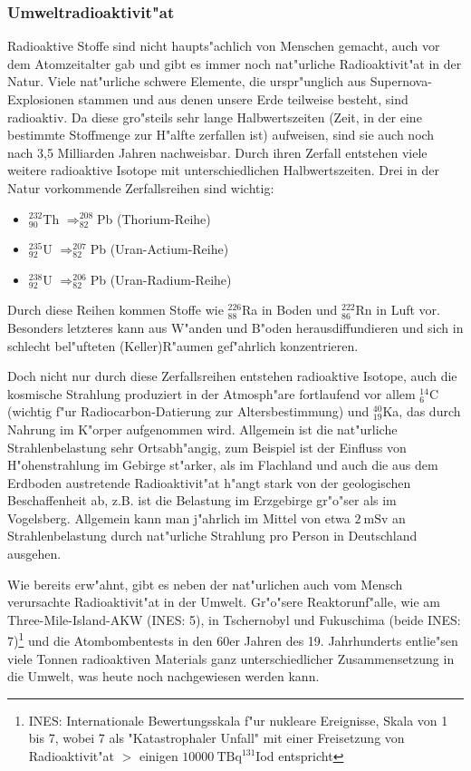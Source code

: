 \documentclass[12pt]{article}
\begin{document}
\subsubsection{Umweltradioaktivit"at}
\label{ch:umw}
Radioaktive Stoffe sind nicht haupts"achlich von Menschen gemacht, auch vor dem Atomzeitalter gab und gibt es immer noch nat"urliche Radioaktivit"at in der Natur. Viele nat"urliche schwere Elemente, die urspr"unglich aus Supernova-Explosionen stammen und aus denen unsere Erde teilweise besteht, sind radioaktiv. Da diese gro"steils sehr lange Halbwertszeiten (Zeit, in der eine bestimmte Stoffmenge zur H"alfte zerfallen ist) aufweisen, sind sie auch noch nach 3,5 Milliarden Jahren nachweisbar. Durch ihren Zerfall entstehen viele weitere radioaktive Isotope mit unterschiedlichen Halbwertszeiten. Drei in der Natur vorkommende Zerfallsreihen sind wichtig:
\begin{itemize}
	\item $^{232}_{90}$Th $\Rightarrow ^{208}_{82}$Pb (Thorium-Reihe)
	\item $^{235}_{92}$U $\Rightarrow ^{207}_{82}$Pb (Uran-Actium-Reihe)
	\item $^{238}_{92}$U $\Rightarrow ^{206}_{82}$Pb (Uran-Radium-Reihe)
\end{itemize}
Durch diese Reihen kommen Stoffe wie $^{226}_{88}$Ra in Boden und $^{222}_{86}$Rn in Luft vor. Besonders letzteres kann aus W"anden und B"oden herausdiffundieren und sich in schlecht bel"ufteten (Keller)R"aumen gef"ahrlich konzentrieren. \par 
Doch nicht nur durch diese Zerfallsreihen entstehen radioaktive Isotope, auch die kosmische Strahlung produziert in der Atmosph"are fortlaufend vor allem $^{14}_{6}$C (wichtig f"ur Radiocarbon-Datierung zur Altersbestimmung) und $^{40}_{19}$Ka, das durch Nahrung im K"orper aufgenommen wird. Allgemein ist die nat"urliche Strahlenbelastung sehr Ortsabh"angig, zum Beispiel ist der Einfluss von H"ohenstrahlung im Gebirge st"arker, als im Flachland und auch die aus dem Erdboden austretende Radioaktivit"at h"angt stark von der geologischen Beschaffenheit ab, z.B. ist die Belastung im Erzgebirge gr"o"ser als im Vogelsberg. Allgemein kann man j"ahrlich im Mittel von etwa $\SI{2}{\milli\sievert}$ an Strahlenbelastung durch nat"urliche Strahlung pro Person in Deutschland ausgehen. \par 
Wie bereits erw"ahnt, gibt es neben der nat"urlichen auch vom Mensch verursachte Radioaktivit"at in der Umwelt. Gr"o"sere Reaktorunf"alle, wie am Three-Mile-Island-AKW (INES: 5), in Tschernobyl und Fukuschima (beide INES: 7)\footnote{INES: Internationale Bewertungsskala f"ur nukleare Ereignisse, Skala von 1 bis 7, wobei 7 als "Katastrophaler Unfall" mit einer Freisetzung von Radioaktivit"at $>$ einigen $\SI{10000}{\tera\becquerel} ^{131}$Iod entspricht} und die Atombombentests in den 60er Jahren des 19. Jahrhunderts entlie"sen viele Tonnen radioaktiven Materials ganz unterschiedlicher Zusammensetzung in die Umwelt, was heute noch nachgewiesen werden kann. \par 
\end{document}
